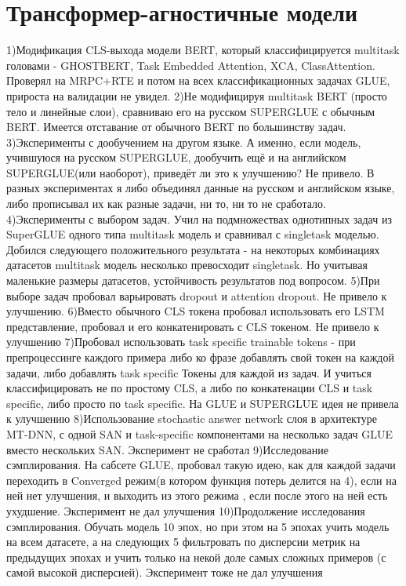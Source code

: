 \chapter{Трансформер-агностичные модели}\label{ch:tr-ag}

1)Модификация CLS-выхода модели BERT, который классифицируется multitask головами - GHOSTBERT, Task Embedded Attention, XCA, ClassAttention. Проверял на MRPC+RTE и потом на всех классификационных задачах GLUE, прироста на валидации не увидел.
2)Не модифицируя multitask BERT (просто тело и линейные слои), сравниваю его на русском SUPERGLUE с обычным BERT. Имеется отставание от обычного BERT по большинству задач.
3)Эксперименты с дообучением на другом языке. А именно, если модель, учившуюся на русском SUPERGLUE, дообучить ещё и на английском SUPERGLUE(или наоборот), приведёт ли это к улучшению? Не привело. В разных экспериментах я либо объединял данные на русском и английском языке, либо прописывал их как разные задачи, ни то, ни то не сработало.
4)Эксперименты с выбором задач. Учил на подмножествах однотипных задач из SuperGLUE одного типа multitask модель и сравнивал с singletask моделью. Добился следующего положительного результата - на некоторых комбинациях датасетов multitask модель несколько превосходит singletask. Но учитывая маленькие размеры датасетов, устойчивость результатов под вопросом.
5)При выборе задач пробовал варьировать dropout и attention dropout. Не привело к улучшению.
6)Вместо обычного CLS токена пробовал использовать его LSTM представление, пробовал и его конкатенировать с CLS токеном. Не привело к улучшению
7)Пробовал использовать task specific trainable tokens - при препроцессинге каждого примера либо ко фразе добавлять свой токен на каждой задачи, либо добавлять task specific Токены для каждой из задач. И учиться классифицировать не по простому CLS, а либо по конкатенации CLS и task specific, либо просто по task specific. На GLUE и SUPERGLUE идея не привела к улучшению
8)Использование stochastic answer network слоя в архитектуре MT-DNN, с одной SAN и task-specific компонентами на несколько задач GLUE вместо нескольких SAN. Эксперимент не сработал
9)Исследование сэмплирования. На сабсете GLUE, пробовал такую идею, как для каждой задачи переходить в Converged режим(в котором функция потерь делится на 4), если на ней нет улучшения, и выходить из этого режима , если после этого на ней есть ухудшение. Эксперимент не дал улучшения
10)Продолжение исследования сэмплирования. Обучать модель 10 эпох, но при этом на 5 эпохах учить модель на всем датасете, а на следующих 5 фильтровать по дисперсии метрик на предыдущих эпохах и учить только на некой доле самых сложных примеров (с самой высокой дисперсией). Эксперимент тоже не дал улучшения



